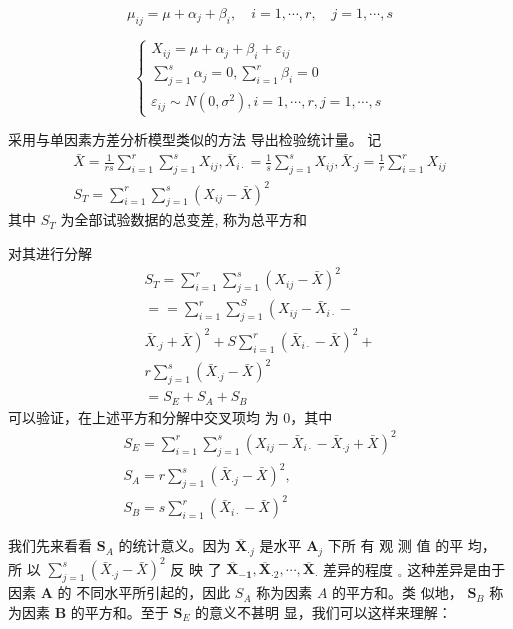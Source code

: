 $$
\mu_{i j}=\mu+\alpha_{j}+\beta_{i}, \quad i=1, \cdots, r, \quad j=1, \cdots, s
$$

$$ \left\{\begin{array}{l}X_{i j}=\mu+\alpha_{j}+\beta_{i}+\varepsilon_{i j} \\ \sum_{j=1}^{s} \alpha_{j}=0, \sum_{i=1}^{r} \beta_{i}=0 \\ \varepsilon_{i j} \sim N\left(0, \sigma^{2}\right), i=1, \cdots, r, j=1, \cdots, s\end{array}\right. $$

采用与单因素方差分析模型类似的方法 导出检验统计量。
记
$$
\begin{array}{c}
\bar{X}=\frac{1}{r s} \sum_{i=1}^{r} \sum_{j=1}^{s} X_{i j}, \bar{X}_{i \cdot}=\frac{1}{s} \sum_{j=1}^{s} X_{i j}, \bar{X}_{\cdot j}=\frac{1}{r} \sum_{i=1}^{r} X_{i j} \\
S_{T}=\sum_{i=1}^{r} \sum_{j=1}^{s}\left(X_{i j}-\bar{X}\right)^{2}
\end{array}
$$
其中 \( S_{T} \) 为全部试验数据的总变差, 称为总平方和

对其进行分解
$$
\begin{array}{c}
S_{T}=\sum_{i=1}^{r} \sum_{j=1}^{s}\left(X_{i j}-\bar{X}\right)^{2} \\
==\sum_{i=1}^{r} \sum_{j=1}^{S}\left(X_{i j}-\bar{X}_{i \cdot}-\right. \\
\left.\bar{X}_{\cdot j}+\bar{X}\right)^{2}+S \sum_{i=1}^{r}\left(\bar{X}_{i \cdot}-\bar{X}\right)^{2}+ \\
r \sum_{j=1}^{s}\left(\bar{X}_{\cdot j}-\bar{X}\right)^{2} \\
=S_{E}+S_{A}+S_{B}
\end{array}
$$
可以验证，在上述平方和分解中交叉项均
为 0，其中
$$
\begin{array}{c}
S_{E}=\sum_{i=1}^{r} \sum_{j=1}^{s}\left(X_{i j}-\bar{X}_{i \cdot}-\bar{X}_{\cdot j}+\bar{X}\right)^{2} \\
S_{A}=r \sum_{j=1}^{s}\left(\bar{X}_{\cdot j}-\bar{X}\right)^{2}, \\
S_{B}= s \sum_{i=1}^{r}\left(\bar{X}_{i \cdot}-\bar{X}\right)^{2}
\end{array}
$$

我们先来看看 \( \boldsymbol{S}_{A} \) 的统计意义。因为 \( \overline{\boldsymbol{X}}_{\mathbf{\cdot} j} \) 是水平 \( \boldsymbol{A}_{j} \) 下所
有 观 测 值 的平 均， 所 以 \( \sum_{j=1}^{s}\left(\bar{X}_{\cdot j}-\bar{X}\right)^{2} \) 反 映 了
\( \overline{\boldsymbol{X}}_{\mathbf{- 1}}, \overline{\boldsymbol{X}}_{\cdot 2}, \cdots, \overline{\boldsymbol{X}}_{\boldsymbol{\cdot}} \) 差异的程度 \( _{\circ} \) 这种差异是由于因素 \( \boldsymbol{A} \) 的
不同水平所引起的，因此 \( S_{A} \) 称为因素 \( A \) 的平方和。类
似地， \( \boldsymbol{S}_{B} \) 称为因素 \( \boldsymbol{B} \) 的平方和。至于 \( \boldsymbol{S}_{E} \) 的意义不甚明
显，我们可以这样来理解：

